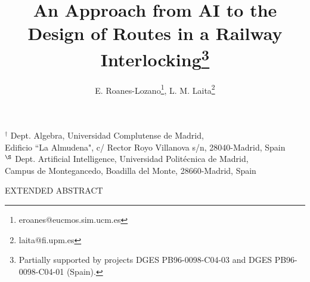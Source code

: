 \documentclass{article}
\begin{document}
\title{An Approach from AI to the Design of Routes in a Railway 
                  Interlocking\thanks{Partially
                              supported by projects DGES PB96-0098-C04-03
                              and DGES PB96-0098-C04-01 (Spain).}}

\author{E. Roanes-Lozano\footnote{eroanes@eucmos.sim.ucm.es}, 
        L. M. Laita\footnote{laita@fi.upm.es} }

\date{}

\newcommand{\NN}{\mbox{{\sl I}}\!\mbox{{\sl N}}}   %
\newcommand{\RR}{\mbox{{\sl I}}\!\mbox{{\sl R}}}   %
\newcommand{\ZZ}{\mbox{{\sl Z}}\!\!\mbox{{\sl Z}}} %

\maketitle

\vspace{-.75cm}

\begin{center}
   ${}^{\dag}$ 
   Dept. Algebra, Universidad Complutense de Madrid, \\
   Edificio ``La Almudena", c/ Rector Royo Villanova s/n, 28040-Madrid,
   Spain               \\
   ${}^{\S}$ 
   Dept. Artificial Intelligence, Universidad Polit\'ecnica de Madrid, \\
   Campus de Montegancedo, Boadilla del Monte, 28660-Madrid, Spain    \\
   \end{center}

\vspace{3mm}

\begin{center}
{\Large EXTENDED ABSTRACT}
\end{center}
\end{document}
